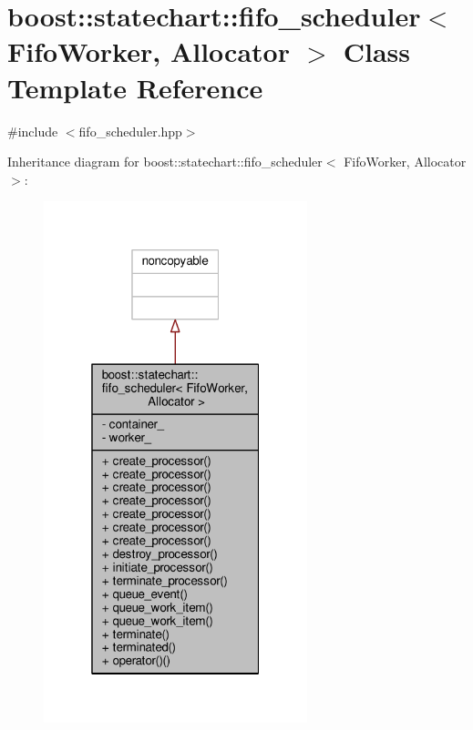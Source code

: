 \hypertarget{classboost_1_1statechart_1_1fifo__scheduler}{}\section{boost\+:\+:statechart\+:\+:fifo\+\_\+scheduler$<$ Fifo\+Worker, Allocator $>$ Class Template Reference}
\label{classboost_1_1statechart_1_1fifo__scheduler}


{\ttfamily \#include $<$fifo\+\_\+scheduler.\+hpp$>$}



Inheritance diagram for boost\+:\+:statechart\+:\+:fifo\+\_\+scheduler$<$ Fifo\+Worker, Allocator $>$\+:
\nopagebreak
\begin{figure}[H]
\begin{center}
\leavevmode
\includegraphics[width=217pt]{classboost_1_1statechart_1_1fifo__scheduler__inherit__graph}
\end{center}
\end{figure}



